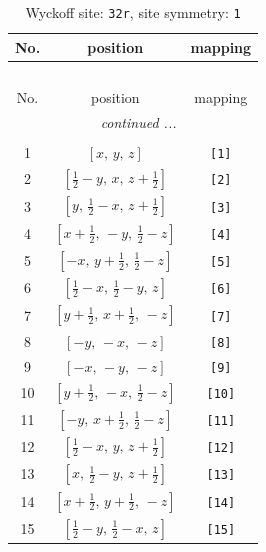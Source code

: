 \documentclass[fleqn,8pt]{jsarticle}
\begin{document}
\renewcommand{\arraystretch}{1.2}
\begin{longtable}{ccc}
\caption{Wyckoff site: {\tt 32r}, site symmetry: {\tt 1}}
 \\
 \hline \hline
No. & position & mapping \\ \hline \endfirsthead

\multicolumn{2}{l}{\tablename\ \thetable{}} \\
 \hline \hline
No. & position & mapping \\ \hline \endhead

 \hline \hline
\multicolumn{2}{r}{\footnotesize\it continued ...} \\ \endfoot

 \hline \hline
\multicolumn{2}{r}{} \\ \endlastfoot

1 & $\left[ x,\, y,\, z \right]$ & {\tt [1]} \\ \hline
2 & $\left[ \frac{1}{2} - y,\, x,\, z + \frac{1}{2} \right]$ & {\tt [2]} \\ \hline
3 & $\left[ y,\, \frac{1}{2} - x,\, z + \frac{1}{2} \right]$ & {\tt [3]} \\ \hline
4 & $\left[ x + \frac{1}{2},\, - y,\, \frac{1}{2} - z \right]$ & {\tt [4]} \\ \hline
5 & $\left[ - x,\, y + \frac{1}{2},\, \frac{1}{2} - z \right]$ & {\tt [5]} \\ \hline
6 & $\left[ \frac{1}{2} - x,\, \frac{1}{2} - y,\, z \right]$ & {\tt [6]} \\ \hline
7 & $\left[ y + \frac{1}{2},\, x + \frac{1}{2},\, - z \right]$ & {\tt [7]} \\ \hline
8 & $\left[ - y,\, - x,\, - z \right]$ & {\tt [8]} \\ \hline
9 & $\left[ - x,\, - y,\, - z \right]$ & {\tt [9]} \\ \hline
10 & $\left[ y + \frac{1}{2},\, - x,\, \frac{1}{2} - z \right]$ & {\tt [10]} \\ \hline
11 & $\left[ - y,\, x + \frac{1}{2},\, \frac{1}{2} - z \right]$ & {\tt [11]} \\ \hline
12 & $\left[ \frac{1}{2} - x,\, y,\, z + \frac{1}{2} \right]$ & {\tt [12]} \\ \hline
13 & $\left[ x,\, \frac{1}{2} - y,\, z + \frac{1}{2} \right]$ & {\tt [13]} \\ \hline
14 & $\left[ x + \frac{1}{2},\, y + \frac{1}{2},\, - z \right]$ & {\tt [14]} \\ \hline
15 & $\left[ \frac{1}{2} - y,\, \frac{1}{2} - x,\, z \right]$ & {\tt [15]} \\ \hline

\end{longtable}
\end{document}

